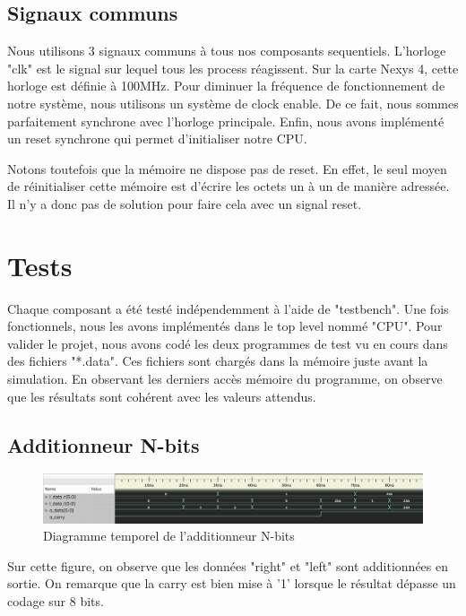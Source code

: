 \documentclass{article}
\begin{document}
    \subsection{Signaux communs}
    \par Nous utilisons 3 signaux communs à tous nos composants sequentiels. L'horloge "clk" est le signal sur lequel tous les process réagissent. Sur la carte Nexys 4, cette horloge est définie à 100MHz. Pour diminuer la fréquence de fonctionnement de notre système, nous utilisons un  système de clock enable. De ce fait, nous sommes parfaitement synchrone avec l'horloge principale. Enfin, nous avons implémenté un reset synchrone qui permet d'initialiser notre CPU. 
    \par Notons toutefois que la mémoire ne dispose pas de reset. En effet, le seul moyen de réinitialiser cette mémoire est d'écrire les octets un à un de manière adressée. Il n'y a donc pas de solution pour faire cela avec un signal reset.
    
	\section{Tests}
    \par Chaque composant a été testé indépendemment à l'aide de "testbench". Une fois fonctionnels, nous les avons implémentés dans le top level nommé "CPU". Pour valider le projet, nous avons codé les deux programmes de test vu en cours dans des fichiers "*.data". Ces fichiers sont chargés dans la mémoire juste avant la simulation. En observant les derniers accès mémoire du programme, on observe que les résultats sont cohérent avec les valeurs attendus.
    \subsection{Additionneur N-bits}
    \begin{figure}[h]
        \centering
        \includegraphics[width=\textwidth]{../doc/tb_screen/addi_n_bits.png}
        \caption{Diagramme temporel de l'additionneur N-bits}
        \label{fig:diag_tb_addi_n_bits}
    \end{figure}
    \par Sur cette figure, on observe que les données "right" et "left" sont additionnées en sortie. On remarque que la carry est bien mise à '1' lorsque le résultat dépasse un codage sur 8 bits.
\end{document}

